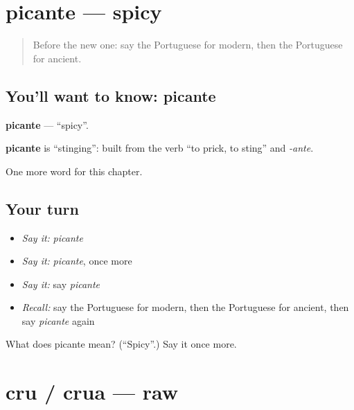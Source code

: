 \section[picante]{picante — spicy}

\label{lesson:PT-C216-picante}



\begin{quote}
Before the new one: say the Portuguese for modern, then the Portuguese for ancient.
\end{quote}

\subsection*{You'll want to know: picante}
\textbf{picante} — \textquotedblleft{}spicy\textquotedblright{}.

\begin{cousinweb}
\textbf{picante} is \textquotedblleft{}stinging\textquotedblright{}: built from the verb \textquotedblleft{}to prick, to sting\textquotedblright{} and \emph{-ante}.
\end{cousinweb}

\begin{grammarlens}[title={What you've built}]
One more word for this chapter.
\end{grammarlens}

\subsection*{Your turn}
\begin{itemize}
\raggedright
  \item \emph{Say it:} \emph{picante}
  \item \emph{Say it:} \emph{picante}, once more
  \item \emph{Say it:} say \emph{picante}
  \item \emph{Recall:} say the Portuguese for modern, then the Portuguese for ancient, then say \emph{picante} again
\end{itemize}

\begin{tcolorbox}[breakable,colback=teal!4,colframe=teal!35!black,title={Before you move on}]
What does picante mean? (\textquotedblleft{}Spicy\textquotedblright{}.) Say it once more.
\end{tcolorbox}
\section[cru / crua]{cru / crua — raw}


